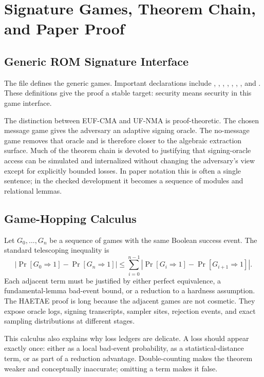 \chapter{Signature Games, Theorem Chain, and Paper Proof}
\label{ch:games}

\section{Generic ROM Signature Interface}

The file  defines the generic games.  Important declarations
include , , , ,
, , , and .
These definitions give the proof a stable target: \haetae{} security means
security in this game interface.

The distinction between EUF-CMA and UF-NMA is proof-theoretic.  The chosen
message game gives the adversary an adaptive signing oracle.  The no-message
game removes that oracle and is therefore closer to the algebraic extraction
surface.  Much of the theorem chain is devoted to justifying that signing-oracle
access can be simulated and internalized without changing the adversary's view
except for explicitly bounded losses.  In paper notation this is often a single
sentence; in the checked development it becomes a sequence of modules and
relational lemmas.

\section{Game-Hopping Calculus}

Let \(G_0,\ldots,G_n\) be a sequence of games with the same Boolean success
event.  The standard telescoping inequality is
\[
  \left|\Pr[G_0\Rightarrow 1]-\Pr[G_n\Rightarrow 1]\right|
  \le
  \sum_{i=0}^{n-1}
  \left|\Pr[G_i\Rightarrow 1]-\Pr[G_{i+1}\Rightarrow 1]\right|.
\]
Each adjacent term must be justified by either perfect equivalence, a
fundamental-lemma bad-event bound, or a reduction to a hardness assumption.  The
HAETAE proof is long because the adjacent games are not cosmetic.  They expose
oracle logs, signing transcripts, sampler sites, rejection events, and exact
sampling distributions at different stages.

This calculus also explains why loss ledgers are delicate.  A loss should appear
exactly once: either as a local bad-event probability, as a statistical-distance
term, or as part of a reduction advantage.  Double-counting makes the theorem
weaker and conceptually inaccurate; omitting a term makes it false.

